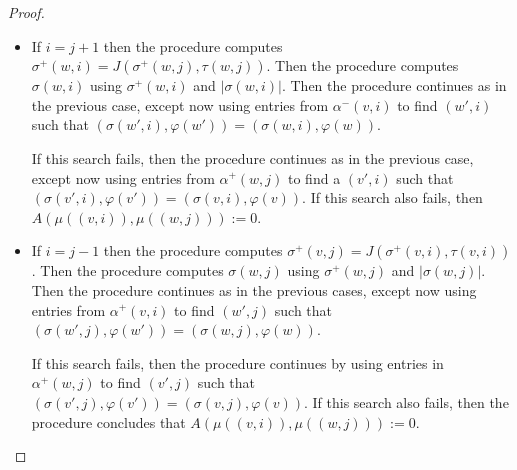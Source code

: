 \documentclass{patmorin}
\begin{document}
\begin{proof}
\begin{itemize}
          If this test fails for each of the entries in the second part of $\alpha(v,i)$, then the procedure concludes that $w\not\in X_{v,i}$ or $(w,i)\not\in N_G((v,i))$.  This still leaves the possibility that $v\in X_{w,i}$ and $(v,i)\in N_G((w,j))$.  The procedure checks this in exactly the same manner, but with the roles of $\mu(v,i)$ and $\mu(w,j)$ reversed.  If this test also fails to return a result, then $A(\mu((v,i)),\mu((w,j))):=0$.

    \item If $i=j+1$ then the procedure computes $\sigma^+(w,i)=J(\sigma^+(w,j),\tau(w,j))$. Then the procedure computes $\sigma(w,i)$ using $\sigma^+(w,i)$ and $|\sigma(w,i)|$. Then the procedure continues as in the previous case, except now using entries from $\alpha^-(v,i)$ to find $(w',i)$ such that $(\sigma(w',i),\varphi(w'))=(\sigma(w,i),\varphi(w))$.

          If this search fails, then the procedure continues as in the previous case, except now using entries from $\alpha^+(w,j)$ to find a $(v',i)$ such that $(\sigma(v',i),\varphi(v'))=(\sigma(v,i),\varphi(v))$.  If this search also fails, then $A(\mu((v,i)),\mu((w,j))):=0$.

    \item If $i=j-1$ then the procedure computes $\sigma^+(v,j)=J(\sigma^+(v,i),\tau(v,i))$. Then the procedure computes $\sigma(w,j)$ using $\sigma^+(w,j)$ and $|\sigma(w,j)|$. Then the procedure continues as in the previous cases, except now using entries from $\alpha^+(v,i)$ to find $(w',j)$ such that $(\sigma(w',j),\varphi(w'))=(\sigma(w,j),\varphi(w))$.

          If this search fails, then the procedure continues by using entries in $\alpha^+(w,j)$ to find $(v',j)$ such that $(\sigma(v',j),\varphi(v'))=(\sigma(v,j),\varphi(v))$.  If this search also fails, then the procedure concludes that $A(\mu((v,i)),\mu((w,j))):=0$.
  \end{itemize}


\end{proof}
\end{document}
